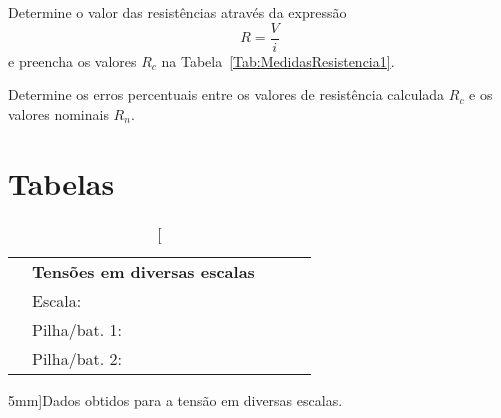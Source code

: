 \begin{question}[type={exam}]
Determine o valor das resistências através da expressão
\begin{equation}
    R = \frac{V}{i}
\end{equation}
%
e preencha os valores $R_c$ na Tabela~\ref{Tab:MedidasResistencia1}.
\end{question}

\begin{question}[type={exam}]
Determine os erros percentuais entre os valores de resistência calculada $R_c$ e os valores nominais $R_n$. 
\end{question}

\vfill
\pagebreak
\section{Tabelas}

\begin{table*}[!ht]
\centering
\begin{tabular}{lp{20mm}p{20mm}p{20mm}p{20mm}p{20mm}p{20mm}p{20mm}l}
\toprule
    & \multicolumn{5}{l}{\textbf{Tensões em diversas escalas}} \\
    \cmidrule{2-8}
    & Escala: \cellcolor[gray]{0.89} & \cellcolor[gray]{0.92} & \cellcolor[gray]{0.89} & \cellcolor[gray]{0.92} & \cellcolor[gray]{0.89} & \cellcolor[gray]{0.92} & \cellcolor[gray]{0.89} & \\
    & Pilha/bat. 1: \cellcolor[gray]{0.95} & \cellcolor[gray]{0.97} & \cellcolor[gray]{0.95} & \cellcolor[gray]{0.97} & \cellcolor[gray]{0.95} & \cellcolor[gray]{0.97} &  \cellcolor[gray]{0.95} \\
    & Pilha/bat. 2: \cellcolor[gray]{0.89} & \cellcolor[gray]{0.92} & \cellcolor[gray]{0.89} & \cellcolor[gray]{0.92} & \cellcolor[gray]{0.89} & \cellcolor[gray]{0.92} & \cellcolor[gray]{0.89} \\
\bottomrule
\end{tabular}
\caption[][5mm]{Dados obtidos para a tensão em diversas escalas.}
\label{Tab:TensaoPilha}
\end{table*}

\vspace{3cm}

